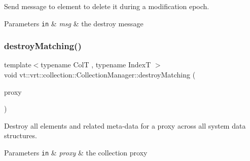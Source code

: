 Send message to element to delete it during a modification epoch. 


\begin{DoxyParams}[1]{Parameters}
\mbox{\tt in}  & {\em msg} & the destroy message \\
\hline
\end{DoxyParams}
\mbox{\label{structvt_1_1vrt_1_1collection_1_1_collection_manager_afac7551ce2ddeeff21631fa9e6987784}} 
\subsubsection{\texorpdfstring{destroy\+Matching()}{destroyMatching()}}
{\footnotesize\ttfamily template$<$typename ColT , typename IndexT $>$ \\
void vt\+::vrt\+::collection\+::\+Collection\+Manager\+::destroy\+Matching (\begin{DoxyParamCaption}\item[{\hyperlink{structvt_1_1vrt_1_1collection_1_1_collection_manager_a56458ed7f9bb22b631b9b3a745f42f94}{Collection\+Proxy\+Wrap\+Type}$<$ ColT, IndexT $>$ const \&}]{proxy }\end{DoxyParamCaption})\hspace{0.3cm}{\ttfamily [private]}}



Destroy all elements and related meta-\/data for a proxy across all system data structures. 


\begin{DoxyParams}[1]{Parameters}
\mbox{\tt in}  & {\em proxy} & the collection proxy \\
\hline
\end{DoxyParams}
\mbox{\label{structvt_1_1vrt_1_1collection_1_1_collection_manager_a0af41830e89efe84a071d3dcb1296b1b}} 
